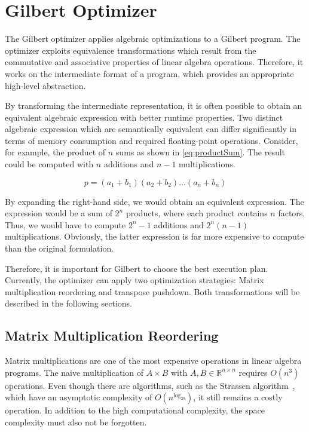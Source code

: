 \chapter{Gilbert Optimizer}
\label{cha:optimizer}


The Gilbert optimizer applies algebraic optimizations to a Gilbert program.
The optimizer exploits equivalence transformations which result from the commutative and associative properties of linear algebra operations.
Therefore, it works on the intermediate format of a program, which provides an appropriate high-level abstraction.

By transforming the intermediate representation, it is often possible to obtain an equivalent algebraic expression with better runtime properties.
Two distinct algebraic expression which are semantically equivalent can differ significantly in terms of memory consumption and required floating-point operations.
Consider, for example, the product of $n$ sums as shown in \cref{eq:productSum}.
The result could be computed with $n$ additions and $n-1$ multiplications.

\begin{equation}
	p = (a_1 + b_1)(a_2 + b_2)\ldots(a_n + b_n) \label{eq:productSum}
\end{equation}

By expanding the right-hand side, we would obtain an equivalent expression.
The expression would be a sum of $2^n$ products, where each product contains $n$ factors.
Thus, we would have to compute $2^n-1$ additions and $2^n(n-1)$ multiplications.
Obviously, the latter expression is far more expensive to compute than the original formulation.

Therefore, it is important for Gilbert to choose the best execution plan.
Currently, the optimizer can apply two optimization strategies: Matrix multiplication reordering and transpose pushdown.
Both transformations will be described in the following sections.

\section{Matrix Multiplication Reordering}

Matrix multiplications are one of the most expensive operations in linear algebra programs.
The naive multiplication of $A\times B$ with $A,B \in \mathbb{R}^{n \times n}$ requires $O(n^3)$ operations.
Even though there are algorithms, such as the Strassen algorithm~\cite{strassen:nm1969a}, which have an asymptotic complexity of $O(n^{\log_28})$, it still remains a costly operation.
In addition to the high computational complexity, the space complexity must also not be forgotten.

